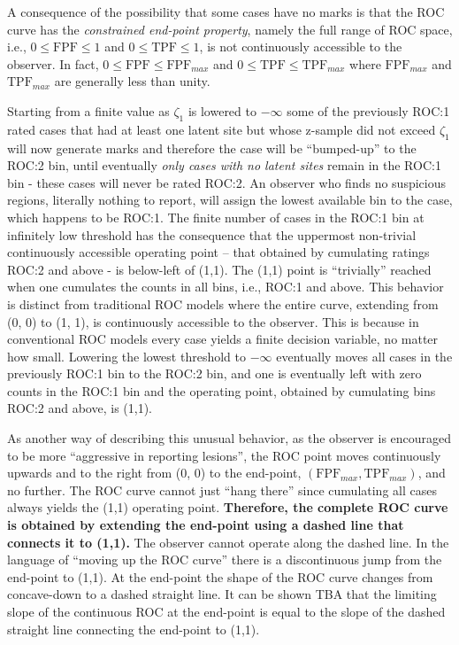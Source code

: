 \documentclass[
]{book}
\begin{document}
A consequence of the possibility that some cases have no marks is that the ROC curve has the \emph{constrained end-point property}, namely the full range of ROC space, i.e., \(0 \leq \text{FPF} \leq 1\) and \(0 \leq \text{TPF} \leq 1\), is not continuously accessible to the observer. In fact, \(0 \leq \text{FPF} \leq \text{FPF}_{max}\) and \(0 \leq \text{TPF} \leq \text{TPF}_{max}\) where \(\text{FPF}_{max}\) and \(\text{TPF}_{max}\) are generally less than unity.

Starting from a finite value as \(\zeta_1\) is lowered to \(-\infty\) some of the previously ROC:1 rated cases that had at least one latent site but whose z-sample did not exceed \(\zeta_1\) will now generate marks and therefore the case will be ``bumped-up'' to the ROC:2 bin, until eventually \emph{only cases with no latent sites} remain in the ROC:1 bin - these cases will never be rated ROC:2. An observer who finds no suspicious regions, literally nothing to report, will assign the lowest available bin to the case, which happens to be ROC:1. The finite number of cases in the ROC:1 bin at infinitely low threshold has the consequence that the uppermost non-trivial continuously accessible operating point -- that obtained by cumulating ratings ROC:2 and above - is below-left of (1,1). The (1,1) point is ``trivially'' reached when one cumulates the counts in all bins, i.e., ROC:1 and above. This behavior is distinct from traditional ROC models where the entire curve, extending from (0, 0) to (1, 1), is continuously accessible to the observer. This is because in conventional ROC models every case yields a finite decision variable, no matter how small. Lowering the lowest threshold to \(-\infty\) eventually moves all cases in the previously ROC:1 bin to the ROC:2 bin, and one is eventually left with zero counts in the ROC:1 bin and the operating point, obtained by cumulating bins ROC:2 and above, is (1,1).

As another way of describing this unusual behavior, as the observer is encouraged to be more ``aggressive in reporting lesions'', the ROC point moves continuously upwards and to the right from (0, 0) to the end-point, \(\left (\text{FPF}_{max}, \text{TPF}_{max} \right )\), and no further. The ROC curve cannot just ``hang there'' since cumulating all cases always yields the (1,1) operating point. \textbf{Therefore, the complete ROC curve is obtained by extending the end-point using a dashed line that connects it to (1,1).} The observer cannot operate along the dashed line. In the language of ``moving up the ROC curve'' there is a discontinuous jump from the end-point to (1,1). At the end-point the shape of the ROC curve changes from concave-down to a dashed straight line. It can be shown TBA that the limiting slope of the continuous ROC at the end-point is equal to the slope of the dashed straight line connecting the end-point to (1,1).
\end{document}
